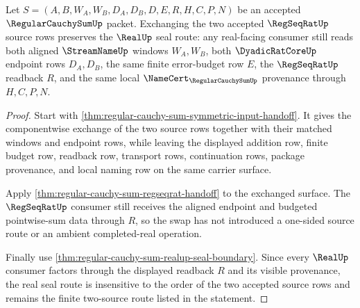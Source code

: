 \begin{theorem}
\label{thm:regular-cauchy-sum-two-source-real-seal-symmetry}
Let $S=(A,B,W_A,W_B,D_A,D_B,D,E,R,H,C,P,N)$ be an accepted $\RegularCauchySumUp$ packet. Exchanging the two accepted $\RegSeqRatUp$ source rows preserves the $\RealUp$ seal route: any real-facing consumer still reads both aligned $\StreamNameUp$ windows $W_A,W_B$, both $\DyadicRatCoreUp$ endpoint rows $D_A,D_B$, the same finite error-budget row $E$, the $\RegSeqRatUp$ readback $R$, and the same local $\NameCert_{\RegularCauchySumUp}$ provenance through $H,C,P,N$.
\end{theorem}
\begin{proof}
Start with \autoref{thm:regular-cauchy-sum-symmetric-input-handoff}. It gives the componentwise exchange of the two source rows together with their matched windows and endpoint rows, while leaving the displayed addition row, finite budget row, readback row, transport rows, continuation rows, package provenance, and local naming row on the same carrier surface.

Apply \autoref{thm:regular-cauchy-sum-regseqrat-handoff} to the exchanged surface. The $\RegSeqRatUp$ consumer still receives the aligned endpoint and budgeted pointwise-sum data through $R$, so the swap has not introduced a one-sided source route or an ambient completed-real operation.

Finally use \autoref{thm:regular-cauchy-sum-realup-seal-boundary}. Since every $\RealUp$ consumer factors through the displayed readback $R$ and its visible provenance, the real seal route is insensitive to the order of the two accepted source rows and remains the finite two-source route listed in the statement.
\end{proof}

